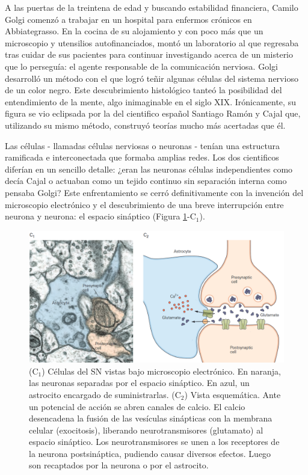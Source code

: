 A las puertas de la treintena de edad y buscando estabilidad financiera, Camilo Golgi comenzó a trabajar en un hospital para enfermos crónicos en Abbiategrasso. En la cocina de su alojamiento y con poco más que un microscopio y utensilios autofinanciados, montó un laboratorio al que regresaba tras cuidar de sus pacientes para continuar investigando acerca de un misterio que lo perseguía: el agente responsable de la comunicación nerviosa. Golgi desarrolló un método con el que logró teñir algunas células del sistema nervioso de un color negro. Este descubrimiento histológico tanteó la posibilidad del entendimiento de la mente, algo inimaginable en el siglo XIX. Irónicamente, su figura se vio eclipsada por la del cientifico español Santiago Ramón y Cajal que, utilizando su mismo método, construyó teorías mucho más acertadas que él.

Las células - llamadas células nerviosas o neuronas - tenían una estructura ramificada e interconectada que formaba amplias redes. Los dos cientificos diferían en un sencillo detalle: ¿eran las neuronas células independientes como decía Cajal o actuaban como un tejido continuo sin separación interna como pensaba Golgi? Este enfrentamiento se cerró definitivamente con la invención del microscopio electrónico y el descubrimiento de una breve interrupción entre neurona y neurona: el espacio sináptico (Figura \ref{synapse}-C$_1$).

\begin{figure}[H]
	\centering

	\includegraphics[width=\linewidth]{media/3-synapse.png}
	\caption{(C$_1$) Células del SN vistas bajo microscopio electrónico. En naranja, las neuronas separadas por el espacio sináptico. En azul, un astrocito encargado de suministrarlas. (C$_2$) Vista esquemática. Ante un potencial de acción se abren canales de calcio. El calcio desencadena la fusión de las vesículas sinápticas con la membrana celular (exocitosis), liberando neurotransmisores (glutamato) al espacio sináptico. Los neurotransmisores se unen a los receptores de la neurona postsináptica, pudiendo causar diversos efectos. Luego son recaptados por la neurona o por el astrocito.}
	\label{synapse}
\end{figure}

